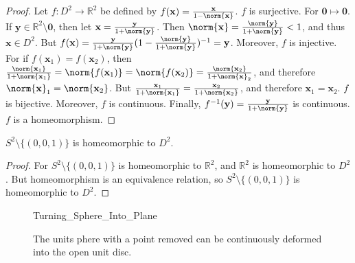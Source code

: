 \documentclass[crop=false,class=article,oneside]{standalone}
\begin{document}
        \begin{proof}
            Let $f:D^{2}\rightarrow\mathbb{R}^{2}$
            be defined by
            $f(\mathbf{x})%
             =\frac{\mathbf{x}}{1-\norm{\mathbf{x}}}$.
            $f$ is surjective.
            For $\mathbf{0}\mapsto\mathbf{0}$.
            If $\mathbf{y}\in\mathbb{R}^2\setminus\mathbf{0}$,
            then let
            $\mathbf{x}=\frac{\mathbf{y}}{1+\norm{\mathbf{y}}}$.
            Then
            $\norm{\mathbf{x}}%
             =\frac{\norm{\mathbf{y}}}{1+\norm{\mathbf{y}}}<1$,
            and thus $\mathbf{x}\in D^{2}$.
            But
            $f(\mathbf{x})%
             =\frac{\mathbf{y}}{1+\norm{\mathbf{y}}}%
              (1-\frac{\norm{\mathbf{y}}}%
                      {1+\norm{\mathbf{y}}})^{-1}%
             =\mathbf{y}$.
            Moreover, $f$ is injective.
            For if
            $f(\mathbf{x}_{1})=f(\mathbf{x}_{2})$,
            then
            $\frac{\norm{\mathbf{x}_{1}}}%
             {1+\norm{\mathbf{x}_{1}}}%
             =\norm{f(\mathbf{x}_{1})}%
             =\norm{f(\mathbf{x}_{2})}%
             =\frac{\norm{\mathbf{x}_{2}}}%
              {1+\norm{\mathbf{x}}_{2}}$,
            and therefore
            $\norm{\mathbf{x}}_{1}=\norm{\mathbf{x}_{2}}$.
            But
            $\frac{\mathbf{x}_{1}}{1+\norm{\mathbf{x}_{1}}}%
             =\frac{\mathbf{x}_{2}}{1+\norm{\mathbf{x}_{2}}}$,
            and therefore $\mathbf{x}_{1}=\mathbf{x}_{2}$.
            $f$ is bijective.
            Moreover, $f$ is continuous. Finally,
            $f^{-1}(\mathbf{y})%
             =\frac{\mathbf{y}}{1+\norm{\mathbf{y}}}$
            is continuous. $f$ is a homeomorphism.
        \end{proof}
        \begin{theorem}
            $S^{2}\setminus\{(0,0,1)\}$
            is homeomorphic to $D^{2}$.
        \end{theorem}
        \begin{proof}
            For $S^{2}\setminus\{(0,0,1)\}$ is
            homeomorphic to $\mathbb{R}^{2}$, and
            $\mathbb{R}^{2}$ is homeomorphic to $D^{2}$.
            But homeomorphism is an equivalence relation, so
            $S^{2}\setminus\{(0,0,1)\}$
            is homeomorphic to $D^{2}$.
        \end{proof}
        \begin{figure}[H]
            \centering
            \captionsetup{type=figure}
            {Turning_Sphere_Into_Plane}
            \caption[Homeomorphism Between 
                     $S^{2}\setminus\{(0,0,1)\}$ and $D^{2}$.]
                    {The units phere with a point removed can be
                     continuously deformed into the open unit disc.}
            \label{fig:my_label}
        \end{figure}
\end{document}
